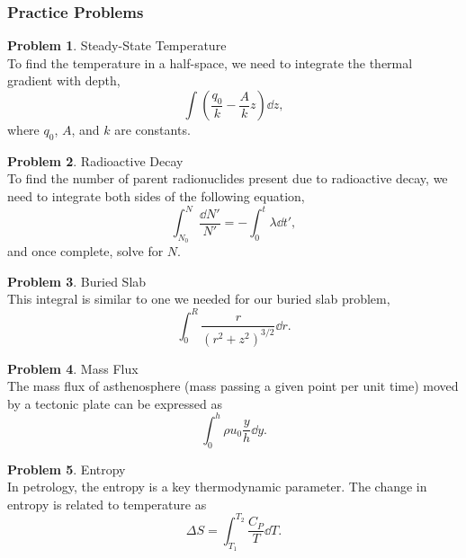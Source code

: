 \documentclass[final,a4paper,12pt]{article}
\theoremstyle{definition}
\newtheorem{problem}{Problem}[section]
\begin{document}
\subsubsection{Practice Problems}

\begin{problem}
    Steady-State Temperature \\
    To find the temperature in a half-space, we need to integrate the thermal
    gradient with depth,
    \begin{equation*}
        \int \left( \frac{q_0}{k} - \frac{A}{k} z \right) \dd{z} ,
    \end{equation*}
    where $q_0$, $A$, and $k$ are constants.
\end{problem}

\begin{problem}
    Radioactive Decay \\
    To find the number of parent radionuclides present due to radioactive
    decay, we need to integrate both sides of the following equation,
    \begin{equation*}
        \int_{N_0}^N \frac{\dd{N'}}{N'} = - \int_0^t \lambda \dd{t'} ,
    \end{equation*}
    and once complete, solve for $N$.
\end{problem}

\begin{problem}
    Buried Slab \\
    This integral is similar to one we needed for our buried slab problem,
    \begin{equation*}
        \int_0^R \frac{r}{(r^2 + z^2)^{3/2}} \dd{r} .
    \end{equation*}
\end{problem}

\begin{problem}
    Mass Flux \\
    The mass flux of asthenosphere (mass passing a given point per unit time)
    moved by a tectonic plate can be expressed as
    \begin{equation*}
        \int_0^h \rho u_0 \frac{y}{h} \dd{y} .
    \end{equation*}
\end{problem}

\begin{problem}
    Entropy \\
    In petrology, the entropy is a key thermodynamic parameter.  The change in
    entropy is related to temperature as
    \begin{equation}
        \Delta S = \int_{T_1}^{T_2} \frac{C_P}{T} \dd{T} .
    \end{equation}
\end{problem}
\end{document}
